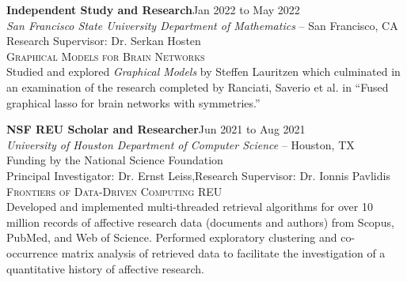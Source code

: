\documentclass[hidelinks, 10pt]{article}
\begin{document}
{{\begin{minipage}[ct]{0.9\linewidth}
\textbf{Independent Study and Research}\hfill Jan 2022 to May 2022\\
\emph{San Francisco State University Department of Mathematics} -- San Francisco, CA\\
Research Supervisor: Dr. Serkan Hosten\\
{\textsc{Graphical Models for Brain Networks}}
\vspace{1mm}\\
Studied and explored \emph{Graphical Models} by Steffen Lauritzen which
culminated in an examination of the research completed by Ranciati, Saverio et
al. in ``Fused graphical lasso for brain networks with symmetries.''
\end{minipage}

\vspace{4mm}

\begin{minipage}[ct]{0.9\linewidth}
\textbf{NSF REU Scholar and Researcher}\hfill Jun 2021 to Aug 2021\\
\emph{University of Houston Department of Computer Science} -- Houston, TX\\
Funding by the National Science Foundation\\
Principal Investigator: Dr. Ernst Leiss,Research Supervisor: Dr. Ionnis Pavlidis\\
{\textsc{Frontiers of Data-Driven Computing REU}}
\vspace{1mm}\\
Developed and implemented multi-threaded retrieval algorithms for over 10 million
records of affective research data (documents and authors) from Scopus, PubMed,
and Web of Science. Performed exploratory clustering and co-occurrence matrix
analysis of retrieved data to facilitate the investigation of a quantitative history of
affective research.
\end{minipage}

}}
\end{document}
